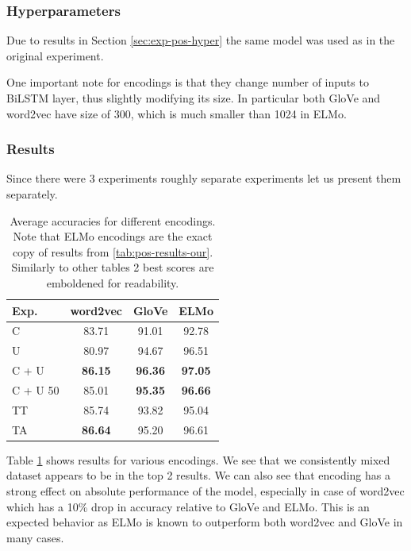 \documentclass[11pt,a4paper]{article}
\begin{document}
    \subsubsection{Hyperparameters}
    Due to results in Section \ref{sec:exp-pos-hyper} the same model was used as in the original experiment.

    One important note for encodings is that they change number of inputs to BiLSTM layer, thus slightly modifying its size. In particular both GloVe and word2vec have size of 300, which is much smaller than 1024 in ELMo.

    \subsubsection{Results}
    Since there were 3 experiments roughly separate experiments let us present them separately.

    \begin{table}[h]
        \centering
        \begin{tabular}{|l|c|c|c|}
            \hline
            Exp.     & word2vec       & GloVe          & ELMo \\
            \hline
            C        & 83.71          & 91.01          & 92.78 \\
            U        & 80.97          & 94.67          & 96.51 \\
            C + U    & \textbf{86.15} & \textbf{96.36} & \textbf{97.05} \\
            C + U 50 & 85.01          & \textbf{95.35} & \textbf{96.66} \\
            TT       & 85.74          & 93.82          & 95.04 \\
            TA       & \textbf{86.64} & 95.20          & 96.61 \\
            \hline
        \end{tabular}
        \caption{Average accuracies for different encodings. Note that ELMo encodings are the exact copy of results from \ref{tab:pos-results-our}. Similarly to other tables 2 best scores are emboldened for readability.}
        \label{tab:epos-encodings}
    \end{table}

    Table \ref{tab:epos-encodings} shows results for various encodings. We see that we consistently mixed dataset appears to be in the top 2 results. We can also see that encoding has a strong effect on absolute performance of the model, especially in case of word2vec which has a 10\% drop in accuracy relative to GloVe and ELMo. This is an expected behavior as ELMo is known to outperform both word2vec and GloVe in many cases.
\end{document}
